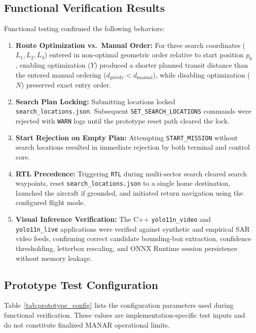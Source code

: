 \subsection{Functional Verification Results}
Functional testing confirmed the following behaviors:
\begin{enumerate}
    \item \textbf{Route Optimization vs.\ Manual Order:} For three search coordinates ($L_1, L_2, L_3$) entered in non-optimal geometric order relative to start position $p_0$, enabling optimization ($Y$) produced a shorter planned transit distance than the entered manual ordering ($d_{\mathrm{greedy}} < d_{\mathrm{manual}}$), while disabling optimization ($N$) preserved exact entry order.
    \item \textbf{Search Plan Locking:} Submitting locations locked \texttt{search\_locations.json}. Subsequent \texttt{SET\_SEARCH\_LOCATIONS} commands were rejected with \texttt{WARN} logs until the prototype reset path cleared the lock.
    \item \textbf{Start Rejection on Empty Plan:} Attempting \texttt{START\_MISSION} without search locations resulted in immediate rejection by both terminal and control core.
    \item \textbf{RTL Precedence:} Triggering \texttt{RTL} during multi-sector search cleared search waypoints, reset \texttt{search\_locations.json} to a single home destination, launched the aircraft if grounded, and initiated return navigation using the configured flight mode.
    \item \textbf{Visual Inference Verification:} The C++ \texttt{yolo11n\_video} and \texttt{yolo11n\_live} applications were verified against synthetic and empirical SAR video feeds, confirming correct candidate bounding-box extraction, confidence thresholding, letterbox rescaling, and ONNX Runtime session persistence without memory leakage.
\end{enumerate}

\subsection{Prototype Test Configuration}
Table~\ref{tab:prototype_config} lists the configuration parameters used during functional verification. These values are implementation-specific test inputs and do not constitute finalized MANAR operational limits.

